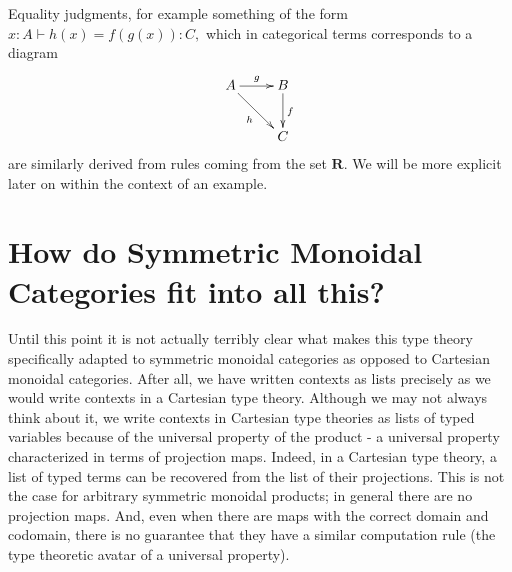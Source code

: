 \documentclass[pra,floatfix,
amsmath,superscriptaddress, 12pt]{article}
\theoremstyle{definition}
\begin{document}
Equality judgments, for example something of the form $x:A\vdash h\left(x\right)=f\left(g\left(x\right)\right):C,$ which in categorical terms corresponds to a diagram
%
\begin{eqnarray*}
    \vcenter{
                \vbox{
                    \xymatrix{
                        A
                        \ar[r]^{g}
                        \ar[dr]_{h}
                            &
                            B
                            \ar[d]^{f}
                                \\
                            &
                                C}}}
\end{eqnarray*}
%
%
are similarly derived from rules coming from the set $\mathbf{R}$. We will be more explicit later on within the context of an example.

\section{How do Symmetric Monoidal Categories fit into all this?}


Until this point it is not actually terribly clear what makes this type theory specifically adapted to symmetric monoidal categories as opposed to Cartesian monoidal categories. After all, we have written contexts as lists precisely as we would write contexts in a Cartesian type theory. 
%
%
Although we may not always think about it, we write contexts in Cartesian type theories as lists of typed variables because of the universal property of the product - a universal property characterized in terms of projection maps. Indeed, in a Cartesian type theory, a list of typed terms can be recovered from the list of their projections. This is not the case for arbitrary symmetric monoidal products; in general there are no projection maps. And, even when there are maps with the correct domain and codomain, there is no guarantee that they have a similar computation rule (the type theoretic avatar of a universal property).
\end{document}
